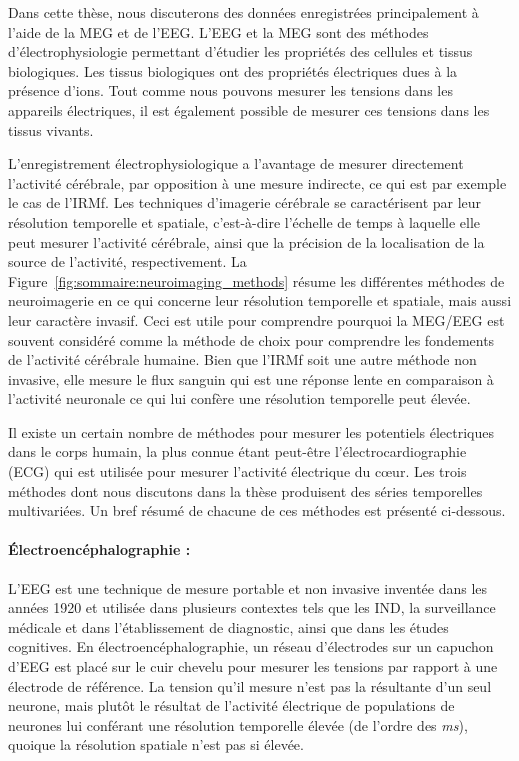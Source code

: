Dans cette thèse, nous discuterons des données enregistrées principalement à l'aide de la MEG et de l’EEG. L'EEG et la MEG sont des méthodes d'électrophysiologie permettant d’étudier les propriétés des cellules et tissus biologiques. Les tissus biologiques ont des propriétés électriques dues à la présence d'ions. Tout comme nous pouvons mesurer les tensions dans les appareils électriques, il est également possible de mesurer ces tensions dans les tissus vivants.

L'enregistrement électrophysiologique a l'avantage de mesurer directement l'activité cérébrale, par opposition à une mesure indirecte, ce qui est par exemple le cas de l'IRMf. Les techniques d'imagerie cérébrale se caractérisent par leur résolution temporelle et spatiale, c'est-à-dire l'échelle de temps à laquelle elle peut mesurer l'activité cérébrale, ainsi que la précision de la localisation de la source de l'activité, respectivement. La Figure~\ref{fig:sommaire:neuroimaging_methods} résume les différentes méthodes de neuroimagerie en ce qui concerne leur résolution temporelle et spatiale, mais aussi leur caractère invasif. Ceci est utile pour comprendre pourquoi la MEG/EEG est souvent considéré comme la méthode de choix pour comprendre les fondements de l'activité cérébrale humaine. Bien que l'IRMf soit une autre méthode non invasive, elle mesure le flux sanguin qui est une réponse lente en comparaison à l'activité neuronale ce qui lui confère une résolution temporelle peut élevée.

Il existe un certain nombre de méthodes pour mesurer les potentiels électriques dans le corps humain, la plus connue étant peut-être l'électrocardiographie (ECG) qui est utilisée pour mesurer l'activité électrique du cœur. Les trois méthodes dont nous discutons dans la thèse produisent des séries temporelles multivariées. Un bref résumé de chacune de ces méthodes est présenté ci-dessous.

\paragraph{Électroencéphalographie :} L'EEG est une technique de mesure portable et non invasive inventée dans les années 1920 et utilisée dans plusieurs contextes tels que les IND, la surveillance médicale et dans l’établissement de diagnostic, ainsi que dans les études cognitives. En électroencéphalographie, un réseau d'électrodes sur un capuchon d’EEG est placé sur le cuir chevelu pour mesurer les tensions par rapport à une électrode de référence. La tension qu'il mesure n'est pas  la résultante d'un seul neurone, mais plutôt le résultat de l'activité électrique de populations de neurones lui conférant une résolution temporelle élevée (de l'ordre des \emph{ms}), quoique la résolution spatiale n'est pas si élevée.


